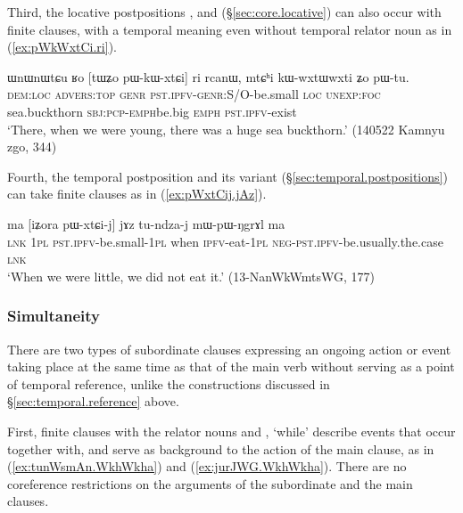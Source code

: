 Third, the locative postpositions ,  and  (§\ref{sec:core.locative}) can also occur with finite clauses, with a temporal meaning even without temporal relator noun as in (\ref{ex:pWkWxtCi.ri}).

 \begin{exe}
\ex \label{ex:pWkWxtCi.ri}
\gll  ɯnɯnɯtɕu ʁo [tɯʑo pɯ-kɯ-xtɕi] ri rcanɯ, mtɕʰi kɯ-wxtɯ\redp{}wxti ʑo pɯ-tu. \\
\textsc{dem}:\textsc{loc} \textsc{advers}:\textsc{top} \textsc{genr} \textsc{pst}.\textsc{ipfv}-\textsc{genr}:S/O-be.small \textsc{loc} \textsc{unexp}:\textsc{foc} sea.buckthorn \textsc{sbj}:\textsc{pcp}-\textsc{emph}\redp{}be.big \textsc{emph} \textsc{pst}.\textsc{ipfv}-exist \\
\glt `There, when we were young, there was a huge sea buckthorn.' (140522 Kamnyu zgo, 344)
 \end{exe}
 
Fourth, the temporal postposition    and its variant  (§\ref{sec:temporal.postpositions}) can take finite clauses as in (\ref{ex:pWxtCij.jAz}).
    
 \begin{exe}
\ex \label{ex:pWxtCij.jAz}
\gll ma [iʑora pɯ-xtɕi-j] jɤz  tu-ndza-j mɯ-pɯ-ŋgrɤl ma \\
\textsc{lnk} \textsc{1pl} \textsc{pst}.\textsc{ipfv}-be.small-\textsc{1pl} when \textsc{ipfv}-eat-\textsc{1pl} \textsc{neg}-\textsc{pst}.\textsc{ipfv}-be.usually.the.case \textsc{lnk} \\
\glt `When we were little, we did not eat it.' (13-NanWkWmtsWG, 177)
 \end{exe}

 
\subsubsection{Simultaneity} \label{sec:simultaneity}
 There are two types of subordinate clauses expressing an ongoing action or event taking place at the same time as that of the main verb without serving as a point of temporal reference, unlike the constructions discussed in §\ref{sec:temporal.reference} above.

 First, finite clauses with the relator nouns   and , `while' describe events that occur together with, and serve as background to the action of the main clause, as in (\ref{ex:tunWsmAn.WkhWkha}) and (\ref{ex:jurJWG.WkhWkha}).  There are no coreference restrictions on the arguments of the subordinate and the main clauses.

